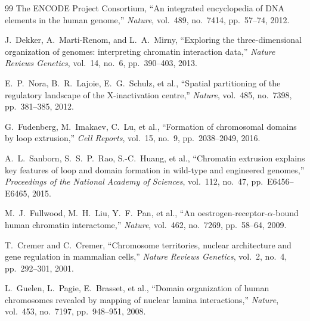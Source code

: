 \documentclass[12pt,a4paper]{article}
\theoremstyle{plain}
\theoremstyle{definition}
\begin{document}
\begin{thebibliography}{99}
The ENCODE Project Consortium,
``An integrated encyclopedia of DNA elements in the human genome,''
\textit{Nature}, vol.~489, no.~7414, pp.~57--74, 2012.

J.~Dekker, A.~Marti-Renom, and L.~A.~Mirny,
``Exploring the three-dimensional organization of genomes: interpreting chromatin interaction data,''
\textit{Nature Reviews Genetics}, vol.~14, no.~6, pp.~390--403, 2013.

E.~P.~Nora, B.~R.~Lajoie, E.~G.~Schulz, et al.,
``Spatial partitioning of the regulatory landscape of the X-inactivation centre,''
\textit{Nature}, vol.~485, no.~7398, pp.~381--385, 2012.

G.~Fudenberg, M.~Imakaev, C.~Lu, et al.,
``Formation of chromosomal domains by loop extrusion,''
\textit{Cell Reports}, vol.~15, no.~9, pp.~2038--2049, 2016.

A.~L.~Sanborn, S.~S.~P.~Rao, S.-C.~Huang, et al.,
``Chromatin extrusion explains key features of loop and domain formation in wild-type and engineered genomes,''
\textit{Proceedings of the National Academy of Sciences}, vol.~112, no.~47, pp.~E6456--E6465, 2015.

M.~J.~Fullwood, M.~H.~Liu, Y.~F.~Pan, et al.,
``An oestrogen-receptor-$\alpha$-bound human chromatin interactome,''
\textit{Nature}, vol.~462, no.~7269, pp.~58--64, 2009.

T.~Cremer and C.~Cremer,
``Chromosome territories, nuclear architecture and gene regulation in mammalian cells,''
\textit{Nature Reviews Genetics}, vol.~2, no.~4, pp.~292--301, 2001.

L.~Guelen, L.~Pagie, E.~Brasset, et al.,
``Domain organization of human chromosomes revealed by mapping of nuclear lamina interactions,''
\textit{Nature}, vol.~453, no.~7197, pp.~948--951, 2008.

\end{thebibliography}
\end{document}
